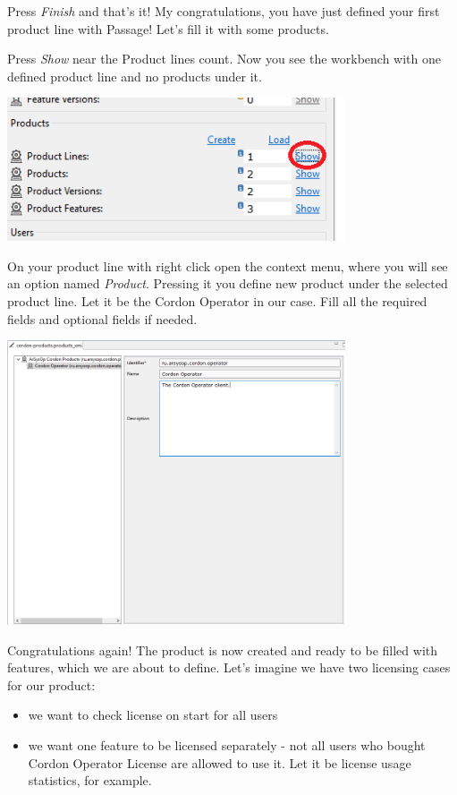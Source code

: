 \documentclass[12pt]{report}
\begin{document}
Press \textit{Finish} and that's it! My congratulations, you have just defined your first product line with Passage! Let's fill it with some products.

Press \textit{Show} near the Product lines count. Now you see the workbench with one defined product line and no products under it.

\begin{center}
    \includegraphics[width=0.75\textwidth]{product_create}
\end{center}

On your product line with right click open the context menu, where you will see an option named \textit{Product}. Pressing it you define new product under the selected product line. 
Let it be the Cordon Operator in our case. Fill all the required fields and optional fields if needed.

\begin{center}
    \includegraphics[width=0.75\textwidth]{product_dialog}
\end{center}

Congratulations again! The product is now created and ready to be filled with features, which we are about to define. Let's imagine we have two licensing cases for our product:
\begin{itemize}
    \item we want to check license on start for all users
    \item we want one feature to be licensed separately - not all users who bought Cordon Operator License are allowed to use it. Let it be license usage statistics, for example.
\end{itemize}
\end{document}
